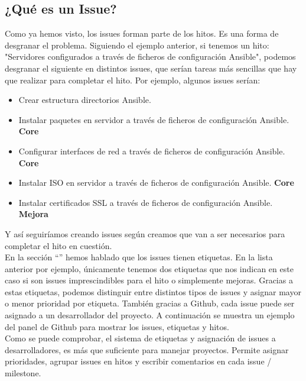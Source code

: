 \subsection{¿Qué es un Issue?}

\begin{text}
	Como ya hemos visto, los issues forman parte de los hitos. Es una forma de desgranar el problema. Siguiendo el ejemplo anterior, si tenemos un hito: "Servidores configurados a través de ficheros de configuración Ansible", podemos desgranar el siguiente en distintos issues, que serían tareas más sencillas que hay que realizar para completar el hito. Por ejemplo, algunos issues serían: 
	\begin{itemize}
		\item Crear estructura directorios Ansible.
		\item Instalar paquetes en servidor a través de ficheros de configuración Ansible. \textbf{Core}
		\item Configurar interfaces de red a través de ficheros de configuración Ansible. \textbf{Core}
		\item Instalar ISO en servidor a través de ficheros de configuración Ansible. \textbf{Core}
		\item Instalar certificados SSL a través de ficheros de configuración Ansible. \textbf{Mejora}
	\end{itemize}
	
	Y así seguiríamos creando issues según creamos que van a ser necesarios para completar el hito en cuestión. \\
	En la sección ``'' hemos hablado que los issues tienen etiquetas. En la lista anterior por ejemplo, únicamente tenemos dos etiquetas que nos indican en este caso si son issues imprescindibles para el hito o simplemente mejoras. Gracias a estas etiquetas, podemos distinguir entre distintos tipos de issues y asignar mayor o menor prioridad por etiqueta. También gracias a Github, cada issue puede ser asignado a un desarrollador del proyecto. A continuación se muestra un ejemplo del panel de Github para mostrar los issues, etiquetas y hitos. \\
	Como se puede comprobar, el sistema de etiquetas y asignación de issues a desarrolladores, es más que suficiente para manejar proyectos. Permite asignar prioridades, agrupar issues en hitos y escribir comentarios en cada issue / milestone. 
	
\end{text}

